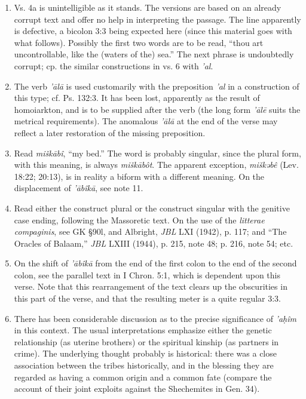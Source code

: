 \begin{enumerate}
\item
Vs. 4a is unintelligible as it stands. The versions are based on an already
corrupt text and offer no help in interpreting the passage. The line apparently
is defective, a bicolon 3:3 being expected here (since this material goes with
what follows). Possibly the first two words are to be read, ``thou art
uncontrollable, like the (waters of the) sea.'' The next phrase is undoubtedly
corrupt; cp. the similar constructions in vs. 6 with \emph{'al}.

\item
The verb \emph{'ālā} is used customarily with the preposition \emph{'al} in a
construction of this type; cf. Ps. 132:3. It has been lost, apparently as the
result of homoiarkton, and is to be supplied after the verb (the long form
\emph{'ālē} suits the metrical requirements). The anomalous \emph{'ālā} at the
end of the verse may reflect a later restoration of the missing preposition.

\item
Read \emph{miškābî}, ``my bed.'' The word is probably singular, since the
plural form, with this meaning, is always \emph{miškābôt}. The apparent
exception, \emph{miškəbê} (Lev. 18:22; 20:13), is in reality a biform with a
different meaning. On the displacement of \emph{'ābîkā}, see note 11.

\item
Read either the construct plural or the construct singular with the genitive
case ending, following the Massoretic text. On the use of the \emph{litterae
compaginis}, see GK §90l, and Albright, \emph{JBL} LXI (1942), p. 117; and
``The Oracles of Balaam,'' \emph{JBL} LXIII (1944), p. 215, note 48; p. 216,
note 54; etc.

\item
On the shift of \emph{'ābîkā} from the end of the first colon to the end of
the second colon, see the parallel text in I Chron. 5:1, which is dependent
upon this verse. Note that this rearrangement of the text clears up the
obscurities in this part of the verse, and that the resulting meter is a quite
regular 3:3.

\item
There has been considerable discussion as to the precise significance of
\emph{'aḥîm} in this context. The usual interpretations emphasize either the
genetic relationship (as uterine brothers) or the spiritual kinship (as
partners in crime). The underlying thought probably is historical: there was a
close association between the tribes historically, and in the blessing they
are regarded as having a common origin and a common fate (compare the account
of their joint exploits against the Shechemites in Gen. 34).


\end{enumerate}
